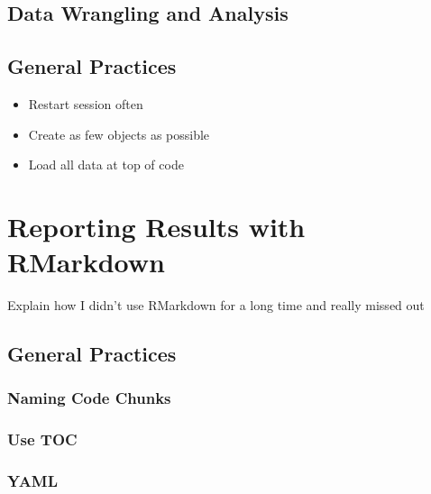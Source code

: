 \documentclass[]{book}
\providecommand{\tightlist}{%
  \setlength{\itemsep}{0pt}\setlength{\parskip}{0pt}}
\begin{document}
\hypertarget{data-wrangling-and-analysis}{%
\section{Data Wrangling and Analysis}\label{data-wrangling-and-analysis}}

\hypertarget{general-practices}{%
\section{General Practices}\label{general-practices}}

\begin{itemize}
\tightlist
\item
  Restart session often\\
\item
  Create as few objects as possible\\
\item
  Load all data at top of code
\end{itemize}

\hypertarget{reporting-results-with-rmarkdown}{%
\chapter{Reporting Results with RMarkdown}\label{reporting-results-with-rmarkdown}}

Explain how I didn't use RMarkdown for a long time and really missed out

\hypertarget{general-practices-1}{%
\section{General Practices}\label{general-practices-1}}

\hypertarget{naming-code-chunks}{%
\subsection{Naming Code Chunks}\label{naming-code-chunks}}

\hypertarget{use-toc}{%
\subsection{Use TOC}\label{use-toc}}

\hypertarget{yaml}{%
\subsection{YAML}\label{yaml}}
\end{document}
